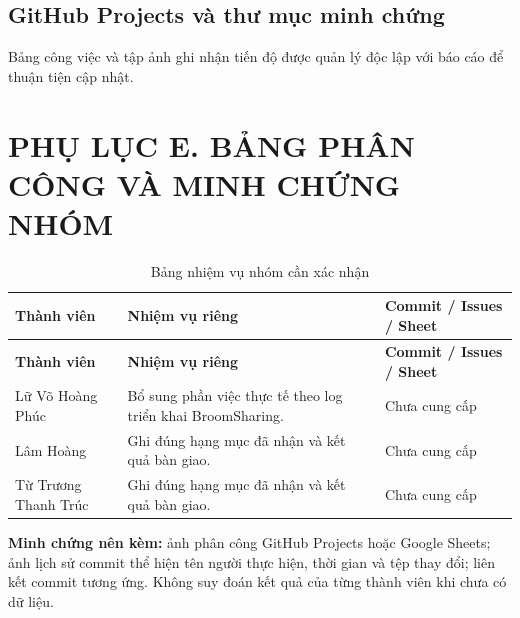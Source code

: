\subsection*{GitHub Projects và thư mục minh chứng}
Bảng công việc và tập ảnh ghi nhận tiến độ được quản lý độc lập với báo cáo để thuận tiện cập nhật.
\begin{center}
{\large\bfseries
{}
}\par\smallskip
{\large\bfseries
{}
}
\end{center}


\clearpage
\section*{PHỤ LỤC E. BẢNG PHÂN CÔNG VÀ MINH CHỨNG NHÓM}
\begin{longtable}{@{}>{\raggedright\arraybackslash}p{4.2cm}p{6.7cm}p{3.2cm}@{}}\caption{Bảng nhiệm vụ nhóm cần xác nhận}\label{tab:append_assign}\\\toprule
\textbf{Thành viên}&\textbf{Nhiệm vụ riêng}&\textbf{Commit / Issues / Sheet}\\\midrule\endfirsthead
\toprule\textbf{Thành viên}&\textbf{Nhiệm vụ riêng}&\textbf{Commit / Issues / Sheet}\\\midrule\endhead
Lữ Võ Hoàng Phúc& Bổ sung phần việc thực tế theo log triển khai BroomSharing.& Chưa cung cấp\\
Lâm Hoàng& Ghi đúng hạng mục đã nhận và kết quả bàn giao.& Chưa cung cấp\\
Từ Trương Thanh Trúc& Ghi đúng hạng mục đã nhận và kết quả bàn giao.& Chưa cung cấp\\
\bottomrule\end{longtable}
\noindent\textbf{Minh chứng nên kèm:} ảnh phân công GitHub Projects hoặc Google Sheets; ảnh lịch sử commit thể hiện tên người thực hiện, thời gian và tệp thay đổi; liên kết commit tương ứng. Không suy đoán kết quả của từng thành viên khi chưa có dữ liệu.

\clearpage
